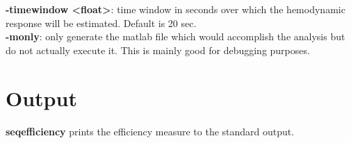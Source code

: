 \documentclass[10pt]{article}
\begin{document}
\noindent
{\bf -timewindow <float>}:  time window in seconds over which the
hemodynamic response will be estimated.  Default is 20 sec.\\

\noindent
{\bf -monly}: only generate the matlab file which would accomplish the
analysis but do not actually execute it.  This is mainly good for
debugging purposes.\\

\section{Output}

{\bf seqefficiency} prints the efficiency measure to the standard output.\\
\end{document}
